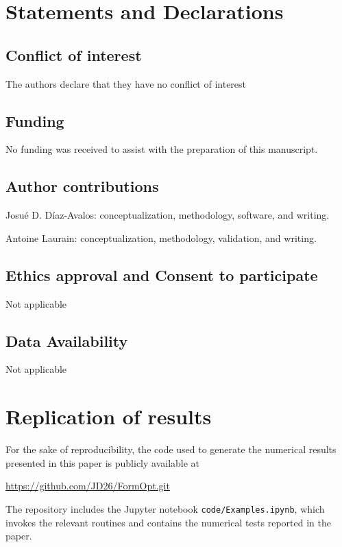 \documentclass[iicol,pdflatex,sn-mathphys-ay]{sn-jnl}%
\theoremstyle{thmstyleone}%
\theoremstyle{thmstyletwo}%
\theoremstyle{thmstylethree}%
\begin{document}

\section*{Statements and Declarations}

\subsection*{Conflict of interest}
The authors declare that they have no conflict of interest

\subsection*{Funding}
No funding was received to assist with the preparation of this manuscript.

\subsection*{Author contributions}

Josu\'e D. D\'iaz-Avalos: conceptualization, methodology, software, and writing.

Antoine Laurain: conceptualization, methodology, validation, and writing.

\subsection*{Ethics approval and Consent to participate} Not applicable

\subsection*{Data Availability} Not applicable

\bigskip

\section*{Replication of results}

For the sake of reproducibility, the code used to generate
the numerical results presented in this paper is publicly available at
\begin{center}
\url{https://github.com/JD26/FormOpt.git}
\end{center}
The repository includes the Jupyter notebook \texttt{code/Examples.ipynb},
which invokes the relevant routines and contains the numerical tests
reported in the paper.



\end{document}
